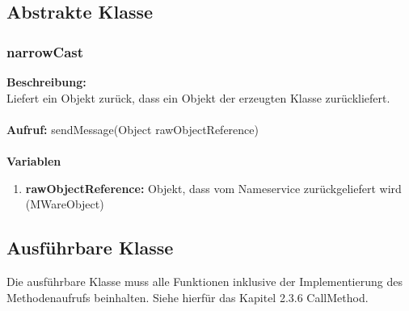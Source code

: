 \subsection{Abstrakte Klasse}

\subsubsection{narrowCast}
\textbf{Beschreibung:}\\
Liefert ein Objekt zurück, dass ein Objekt der erzeugten Klasse zurückliefert.\\ \\
\textbf{Aufruf:} sendMessage(Object rawObjectReference)\\ \\
\textbf{Variablen}
\begin{enumerate}
\item \textbf{rawObjectReference:} Objekt, dass vom Nameservice zurückgeliefert wird (MWareObject)
\end{enumerate}

\subsection{Ausführbare Klasse}
Die ausführbare Klasse muss alle Funktionen inklusive der Implementierung des Methodenaufrufs beinhalten. Siehe hierfür das Kapitel 2.3.6 CallMethod.